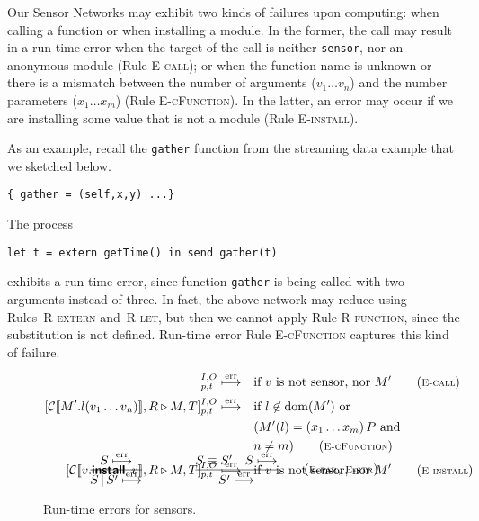 \documentclass[copyright,creativecommons]{eptcs}
\newcommand{\keyw}[1]{\textbf{\textsf{#1}}\,}
\newcommand{\installk}{\keyw{install}}
\newcommand{\sensor}[6]{[{#1} \triangleright {#2}]^{{#3}, {#4}}_{{#5}, {#6}}}
\newcommand{\abstr}[2]{({#1})\,{#2}}
\newcommand{\invk}[3]{{#1}.{#2}({#3})}
\newcommand{\install}[2]{{#1}.\installk\ {#2}}
\newcommand{\parn}{\,\vert\,}
\newcommand{\dom}{\operatorname{dom}}
\newcommand{\congr}{\equiv}
\newcommand{\err}{\overset{\text{err}}{\longmapsto}}
\newcommand{\mkRrule}[1]{{\footnotesize \textsc{R-#1}}}
\newcommand{\mkErule}[1]{{\footnotesize \textsc{E-#1}}}
\newcommand{\Rfunction}{\mkRrule{function}}
\newcommand{\Rlet}{\mkRrule{let}}
\newcommand{\Rsystem}{\mkRrule{extern}}
\newcommand{\Efunction}{\mkErule{cFunction}}
\newcommand{\Ecall}{\mkErule{call}}
\newcommand{\Einstall}{\mkErule{install}}
\newcommand{\Epar}{\mkErule{par}}
\newcommand{\Estr}{\mkErule{str}}
\begin{document}
Our Sensor Networks may exhibit two kinds of failures upon
computing: when calling a function or when installing a module.
In the former, the call may result in a run-time error when the target
of the call is neither \lstinline{sensor}, nor an anonymous module (Rule
\Ecall);
or when the function name is unknown or there is a mismatch
between the number of arguments ($v_1 \dots v_n$) and the number
parameters ($x_1 \dots x_m$) (Rule \Efunction).
In the latter, an error may occur if we are installing some value
that is not a module (Rule \Einstall).

As an example, recall the \lstinline{gather} function from the
streaming data example that we sketched below.
\begin{lstlisting}[frame=none]
  { gather = (self,x,y) ...}
\end{lstlisting}
The process
\begin{lstlisting}[frame=none]
  let t = extern getTime() in send gather(t)
\end{lstlisting}
exhibits a run-time error, since function
\lstinline|gather| is being called with two arguments instead of three.
In fact, the above network may reduce using Rules~\Rsystem{} and~\Rlet, but
then we cannot apply Rule \Rfunction, since the substitution is not
defined.
Run-time error Rule \Efunction{} captures this kind of failure.



\begin{figure}
\begin{align*}
  \sensor {\context{\invk v l {\vec v}}, R} {M,T} I O p t  & \err & &
  \text{if } v \text{ is not \lstinline{sensor}, nor } M'
  \tag{\Ecall}\\[0.07cm]
\sensor {\context{\invk {M'} l {v_1 \dots v_n}}, R} {M,T} I O p t & \err & &
  \text{if } l \not \in \dom(M') \text{ or }
  \\
  & & &  (M'(l) = \abstr {x_1 \dots x_m} {P} \text{ and }\\
  & & & n \neq m)
    \tag{\Efunction}\\[0.07cm]
    \sensor {\context {\install v v}, R} {M, T} I O p t & \err & &
    \text{if } v \text{ is not \lstinline{sensor}, nor } M'
    \tag{\Einstall}\\[-1cm]
  \end{align*}
\begin{align*}
  \frac{
    S \err
  }
  {
    S \parn S' \err
  }
  \qquad \qquad
  \frac{
    S \congr S' \quad
    S \err
  }
  {
    S' \err
  }
  \tag{\Epar, \Estr}
\end{align*}
\caption{Run-time errors for sensors.}
\label{fig:runtime-errors}
\end{figure}
\end{document}
